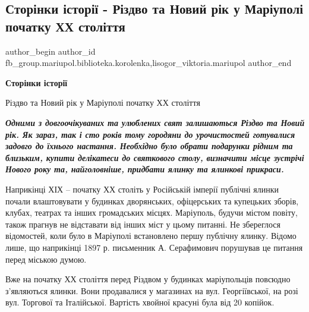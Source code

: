  
 
 
 
 

\subsection{Сторінки історії - Різдво та Новий рік у Маріуполі початку ХХ століття}
\label{sec:28_12_2022.fb.fb_group.mariupol.biblioteka.korolenka.1.stor_nki__stor____r}
 
\ifcmt
 author_begin
   author_id fb_group.mariupol.biblioteka.korolenka,lisogor_viktoria.mariupol
 author_end
\fi

\textbf{Сторінки історії}

{\Large Різдво та Новий рік у Маріуполі початку ХХ століття}

\begingroup
\bfseries\em
Одними з довгоочікуваних та улюблених свят залишаються Різдво та Новий рік. Як
зараз, так і сто років тому городяни до урочистостей готувалися задовго до
їхнього настання. Необхідно було обрати подарунки рідним та близьким, купити
делікатеси до святкового столу, визначити місце зустрічі Нового року та,
найголовніше, придбати ялинку та ялинкові прикраси.
\endgroup

Наприкінці ХІХ – початку ХХ століть у Російській імперії публічні ялинки почали
влаштовувати у будинках дворянських, офіцерських та купецьких зборів, клубах,
театрах та інших громадських місцях. Маріуполь, будучи містом повіту, також
прагнув не відставати від інших міст у цьому питанні. Не збереглося відомостей,
коли було в Маріуполі встановлено першу публічну ялинку. Відомо лише, що
наприкінці 1897 р. письменник А. Серафимович порушував це питання перед міською
думою.

Вже на початку ХХ століття перед Різдвом у будинках маріупольців повсюдно
з'являються ялинки. Вони продавалися у магазинах на вул. Георгіївської, на розі
вул. Торгової та Італійської. Вартість хвойної красуні була від 20 копійок.

